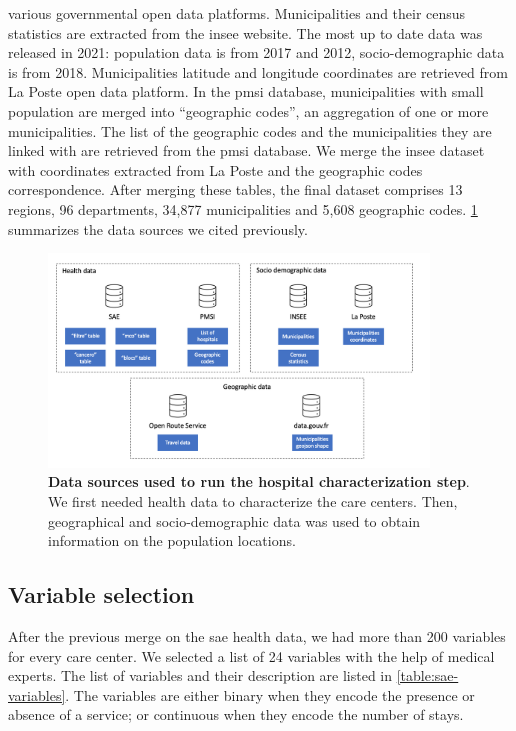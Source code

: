 various governmental open data platforms. Municipalities and their census
statistics are extracted from the \ac{insee} website. The most up to date data
was released in 2021: population data is from 2017 and 2012, socio-demographic
data is from 2018. Municipalities latitude and longitude coordinates are
retrieved from La Poste open data platform. In the \ac{pmsi} database,
municipalities with small population are merged into ``geographic codes'', an
aggregation of one or more municipalities. The list of the geographic codes and
the municipalities they are linked with are retrieved from the \ac{pmsi}
database. We merge the \ac{insee} dataset with coordinates
extracted from La Poste and the geographic codes correspondence. After merging
these tables, the final dataset comprises 13 regions, 96 departments, 34,877
municipalities and 5,608 geographic codes. \cref{fig:data-sources} summarizes
the data sources we cited previously.

\begin{figure}[h]
    \includegraphics[width=0.9\textwidth]{images/camion/databases.png}
    \centering
    \caption{ \textbf{Data sources used to run the hospital characterization
            step}. We first needed health data to characterize the care centers. Then,
        geographical and socio-demographic data was used to obtain information on the
        population locations. }
    \label{fig:data-sources}
\end{figure}

\subsection{Variable selection}

After the previous merge on the \ac{sae} health data, we had more than 200
variables for every care center. We selected a list of 24 variables with the
help of medical experts. The list of variables and their description are listed in
\cref{table:sae-variables}. The variables are either binary when they encode the
presence or absence of a service; or continuous when they encode the number of
stays. %

